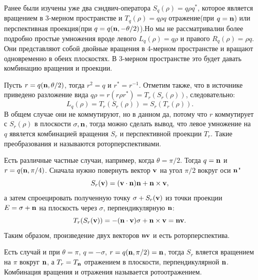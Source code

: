 Ранее были изучены уже два сэндвич-оператора $S_q(\rho) = q\rho q^*$, которое является вращением в 3-мерном пространстве и $T_q(\rho) = q\rho q$ отражение(при $q = \vb{n}$) или перспективная проекция(при $q = q(\vb{n}, -\theta/2)$).Но мы не рассматривалии более подробно простые умножения вроде левого $L_q(\rho) = q\rho$ и правого $R_q(\rho) = \rho q$. Они представляют собой двойные вращения в 4-мерном пространстве и вращают одновременно в обеих плоскостях. В 3-мерном пространстве это будет давать комбинацию вращения и проекции.

Пусть $r = q(\vb{n}, \theta/2)$, тогда $r^2 = q$ и $r^* = r^{-1}$. Отметим также, что в источнике ~\cite{Goldman:2010} приведено разложение вида $q\rho = r(r\rho r^*) = T_r(S_r(\rho))$, следовательно:
\begin{equation*}
    L_q(\rho) = T_r(S_r(\rho)) = S_r(T_r(\rho)).
\end{equation*}
В общем случае они не коммутируют, но в данном да,  потому что  $r$ коммутирует с $S_r(\rho)$ в плоскости $\sigma, \vb{n}$, тогда можно сделать вывод, что левое умножение на $q$ явялется комбинацией вращения $S_r$ и перспективной проекции $T_r$. Такие преобразования и называются роторперспективами.

Есть различные частные случаи, например, когда $\theta = \pi/2$. Тогда $q = \vb{n}$ и $r = q(\vb{n}, \pi/4)$. Сначала нужно повернуть вектор $\vb{v}$ на угол $\pi/2$ вокруг оси $\vb{n}$"
\begin{equation*}
    S_r(\vb{v}) = (\vb{v}\cdot\vb{n})\vb{n} + \vb{n}\times\vb{v},
\end{equation*}
а затем спроецировать полученную точку $\sigma + S_r(\vb{v})$ из точки проекции $E = \sigma + \vb{n}$ на плоскость через $\sigma$, перпендикулярную $\vb{n}$:
\begin{equation*}
    T_r(S_r(\vb{v})) = -(\vb{n}\cdot\vb{v})\sigma + \vb{n}\times\vb{v} = \vb{n}\vb{v}.
\end{equation*}
Таким образом, произведение двух векторов $\vb{n}\vb{v}$ и есть роторперспектива.

Есть случай и при $\theta = \pi$, $q = -\sigma$, $r = q(\vb{n}, \pi/2) = \vb{n}$, тогда $S_r$ вляется вращением на $\pi$ вокруг $\vb{n}$, а $T_r = T_{\vb{n}}$ отражением в плоскости, перпендикулярной $\vb{n}$. Комбинация вращения и отражения называется ротоотражением.


